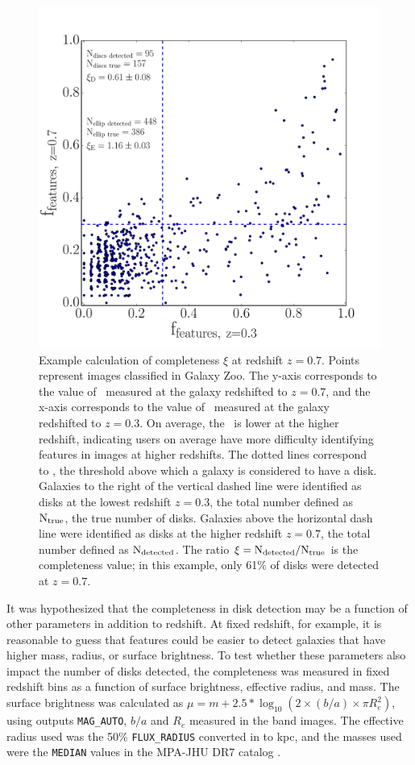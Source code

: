 \documentclass[useAMS,usenatbib]{mn2e}
\begin{document}
\begin{figure}
\centering
\includegraphics[width=.5\textwidth]{figures/incompleteness_z7.pdf}
\caption{Example calculation of completeness $\xi$ at redshift $z=0.7$. Points represent  images classified in Galaxy Zoo. The y-axis corresponds to the value of \ffeatures~measured at the galaxy redshifted to $z=0.7$, and the x-axis corresponds to the value of \ffeatures~measured at the galaxy redshifted to $z=0.3$. On average, the \ffeatures~is lower at the higher redshift, indicating users on average have more difficulty identifying features in images at higher redshifts. The dotted lines correspond to , the threshold above which a galaxy is considered to have a disk. Galaxies to the right of the vertical dashed line were identified as disks at the lowest redshift $z=0.3$, the total number defined as $\rm N_{true}$, the true number of disks. Galaxies above the horizontal dash line were identified as disks at the higher redshift $z=0.7$, the total number defined as $\rm N_{detected}$. The ratio $\rm \xi=N_{detected}/N_{true}$ is the completeness value; in this example, only 61\% of disks were detected at $z=0.7$.}
\label{fig:inc_subplot}
\end{figure}

It was hypothesized that the completeness in disk detection may be a function of other parameters in addition to redshift. At fixed redshift, for example, it is reasonable to guess that features could be easier to detect galaxies that have higher mass, radius, or surface brightness. To test whether these parameters also impact the number of disks detected, the completeness was measured in fixed redshift bins as a function of surface brightness, effective radius, and mass. The surface brightness was calculated as $\mu = m + 2.5*\log_{10}{(2 \times (b/a) \times \pi R_e^2 )}$, using \sextractor{} outputs {\tt MAG\_AUTO}, $b/a$ and $R_{e}$ measured in the \Iband{} band images. The effective radius used was the 50\% {\tt FLUX\_RADIUS} converted in to kpc, and the masses used were the {\tt MEDIAN} values in the MPA-JHU DR7 catalog \citep{Kauffmann2003b}.
\end{document}
